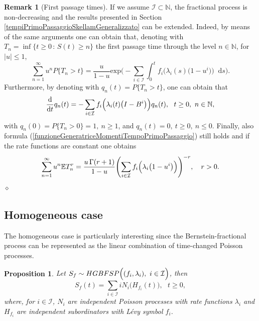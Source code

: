 \documentclass[12pt, twoside, english, headsepline]{article}
\newcommand*\dif{\mathop{}\!\mathrm{d}}  %
\newtheorem{proposition}{Proposition}[section] %
\theoremstyle{definition} %
\newtheorem{remark}{Remark}[section] %
\numberwithin{equation}{section} %
\begin{document}
\begin{remark}[First passage times]
If we assume $\mathcal{I}\subset\mathbb{N}$, the fractional process is non-decreasing and the results presented in Section \ref{tempiPrimoPassaggioSkellamGeneralizzato} can be extended. Indeed, by means of the same arguments one can obtain that, denoting with $T_n = \inf\{t\ge0\,:\,S(t)\ge n\}$ the first passage time through the level $n\in\mathbb{N}$, for $|u|\le 1$,
$$  \sum_{n=1}^\infty u^n P\{T_n > t \}= \frac{u}{1-u} \text{exp}\Biggl(-\sum_{i\in\mathcal{I}} \int_0^t f_i\Big( \lambda_i(s) \big(1-u^i\big)\Big) \dif s \Biggr). $$
Furthermore, by denoting with $q_n(t) = P\{T_n > t\}$, one can obtain that
\begin{equation*}
\frac{\dif }{\dif t}q_n(t) = -\sum_{i\in\mathcal{I}} f_i\Bigl( \lambda_i(t) \big(I-B^i\big)\Big) q_n(t) ,\ \ t\ge0,\ n\in\mathbb{N}, 
\end{equation*}
with $q_n(0) = P\{T_n>0\} = 1, \ n\ge1$, and $q_n(t)=0,\ t\ge0,\ n\le0$.
Finally, also formula (\ref{funzioneGeneratriceMomentiTempoPrimoPassaggio}) still holds and if the rate functions are constant one obtains
$$ \sum_{n=1}^\infty u^n \mathbb{E} T^r_n  = \frac{u\,\Gamma(r+1)}{1-u}\Biggl(\sum_{i\in\mathcal{I}}f_i\Bigl( \lambda_i\big(1-u^i\big)\Big)\Biggr)^{-r},\ \ \ r>0.$$
\hfill$\diamond$
\end{remark}


\subsection{Homogeneous case}

The homogeneous case is particularly interesting since the Bernstein-fractional process can be represented as the linear combination of time-changed Poisson processes.

\begin{proposition}\label{proposizioneScomposizioneSkellamBernsteinFrazionarioInProcessiPoisson}
Let $S_f\sim HGBFSP\Bigl((f_i,\lambda_i),\ i\in\mathcal{I}\Bigr)$, then
\begin{equation}\label{SkellamFrazionarioBernsteinGeneralizzatoInTerminiDiPoisson}
S_f(t)=\sum_{i\in\mathcal{I}} i N_i\big(H_{f_i}(t)\big),\ \ \ t\ge0,
\end{equation}
where, for $ i\in\mathcal{I}$, $N_i$ are independent Poisson processes with rate functions $\lambda_i$ and $H_{f_i}$ are independent subordinators with L\'{e}vy symbol $f_i$.
\end{proposition}
\end{document}
